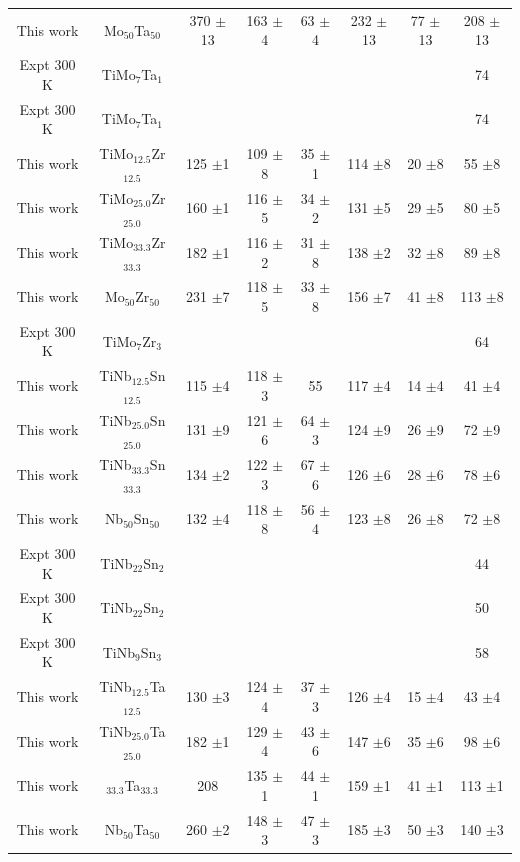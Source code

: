 \begin{longtable}[H]{ c c c c c c c c}
	This work & Mo$_{50}$Ta$_{50}$ & 370 $\pm$13 & 163 $\pm$4 & 63 $\pm$4 & 232 $\pm$13 & 77 $\pm$13 & 208 $\pm$13\\
	Expt 300 K \cite{Mohammed2014} & TiMo$_{7}$Ta$_{1}$ & & & & & & 74\\
	Expt 300 K \cite{Niinomi2012}  & TiMo$_{7}$Ta$_{1}$ & & & & & & 74\\
	This work & TiMo$_{12.5}$Zr$_{12.5}$ & 125 $\pm$1 & 109 $\pm$8 & 35 $\pm$1 & 114 $\pm$8 & 20 $\pm$8 & 55 $\pm$8\\
	This work & TiMo$_{25.0}$Zr$_{25.0}$ & 160 $\pm$1 & 116 $\pm$5 & 34 $\pm$2 & 131 $\pm$5 & 29 $\pm$5 & 80 $\pm$5\\
	This work & TiMo$_{33.3}$Zr$_{33.3}$ & 182 $\pm$1 & 116 $\pm$2 & 31 $\pm$8 & 138 $\pm$2 & 32 $\pm$8 & 89 $\pm$8\\
	This work & Mo$_{50}$Zr$_{50}$ & 231 $\pm$7 & 118 $\pm$5 & 33 $\pm$8 & 156 $\pm$7 & 41 $\pm$8 & 113 $\pm$8\\
	Expt 300 K \cite{Mohammed2014} & TiMo$_{7}$Zr$_{3}$ & & & & & & 64\\
	This work & TiNb$_{12.5}$Sn$_{12.5}$ & 115 $\pm$4 & 118 $\pm$3 & 55 & 117 $\pm$4 & 14 $\pm$4 & 41 $\pm$4\\
	This work & TiNb$_{25.0}$Sn$_{25.0}$ & 131 $\pm$9 & 121 $\pm$6 & 64 $\pm$3 & 124 $\pm$9 & 26 $\pm$9 & 72 $\pm$9\\
	This work & TiNb$_{33.3}$Sn$_{33.3}$ & 134 $\pm$2 & 122 $\pm$3 & 67 $\pm$6 & 126 $\pm$6 & 28 $\pm$6 & 78 $\pm$6\\
	This work & Nb$_{50}$Sn$_{50}$ & 132 $\pm$4 & 118 $\pm$8 & 56 $\pm$4 & 123 $\pm$8 & 26 $\pm$8 & 72 $\pm$8\\
	Expt 300 K \cite{Mohammed2014} & TiNb$_{22}$Sn$_{2}$ & & & & & & 44\\
	Expt 300 K \cite{Niinomi2012} & TiNb$_{22}$Sn$_{2}$ & & & & & & 50\\
	Expt 300 K \cite{Nozoe2007} & TiNb$_{9}$Sn$_{3}$ & & & & & & 58\\
	This work & TiNb$_{12.5}$Ta$_{12.5}$ & 130 $\pm$3 & 124 $\pm$4 & 37 $\pm$3 & 126 $\pm$4 & 15 $\pm$4 & 43 $\pm$4\\
	This work & TiNb$_{25.0}$Ta$_{25.0}$ & 182 $\pm$1 & 129 $\pm$4 & 43 $\pm$6 & 147 $\pm$6 & 35 $\pm$6 & 98 $\pm$6\\
	This work & $_{33.3}$Ta$_{33.3}$ & 208 & 135 $\pm$1 & 44 $\pm$1 & 159 $\pm$1 & 41 $\pm$1 & 113 $\pm$1\\
	This work & Nb$_{50}$Ta$_{50}$ & 260 $\pm$2 & 148 $\pm$3 & 47 $\pm$3 & 185 $\pm$3 & 50 $\pm$3 & 140 $\pm$3\\

\end{longtable}
